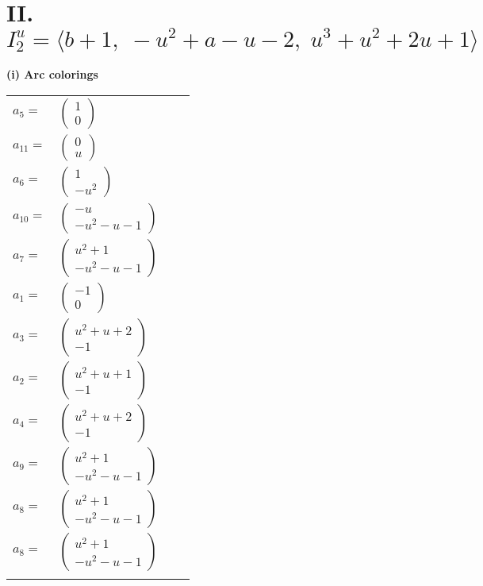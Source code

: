 \documentclass[1p]{elsarticle_modified}
\theoremstyle{definition}
\begin{document}
\centering \section*{II. $I^u_{2}= \langle b+1,\;- u^2+a- u-2,\;u^3+u^2+2 u+1 \rangle$}
\flushleft \textbf{(i) Arc colorings}\\
\begin{tabular}{m{7pt} m{180pt} m{7pt} m{180pt} }
\flushright $a_{5}=$&$\begin{pmatrix}1\\0\end{pmatrix}$ \\
\flushright $a_{11}=$&$\begin{pmatrix}0\\u\end{pmatrix}$ \\
\flushright $a_{6}=$&$\begin{pmatrix}1\\- u^2\end{pmatrix}$ \\
\flushright $a_{10}=$&$\begin{pmatrix}- u\\- u^2- u-1\end{pmatrix}$ \\
\flushright $a_{7}=$&$\begin{pmatrix}u^2+1\\- u^2- u-1\end{pmatrix}$ \\
\flushright $a_{1}=$&$\begin{pmatrix}-1\\0\end{pmatrix}$ \\
\flushright $a_{3}=$&$\begin{pmatrix}u^2+u+2\\-1\end{pmatrix}$ \\
\flushright $a_{2}=$&$\begin{pmatrix}u^2+u+1\\-1\end{pmatrix}$ \\
\flushright $a_{4}=$&$\begin{pmatrix}u^2+u+2\\-1\end{pmatrix}$ \\
\flushright $a_{9}=$&$\begin{pmatrix}u^2+1\\- u^2- u-1\end{pmatrix}$ \\
\flushright $a_{8}=$&$\begin{pmatrix}u^2+1\\- u^2- u-1\end{pmatrix}$\\ \flushright $a_{8}=$&$\begin{pmatrix}u^2+1\\- u^2- u-1\end{pmatrix}$\\&\end{tabular}
\end{document}
